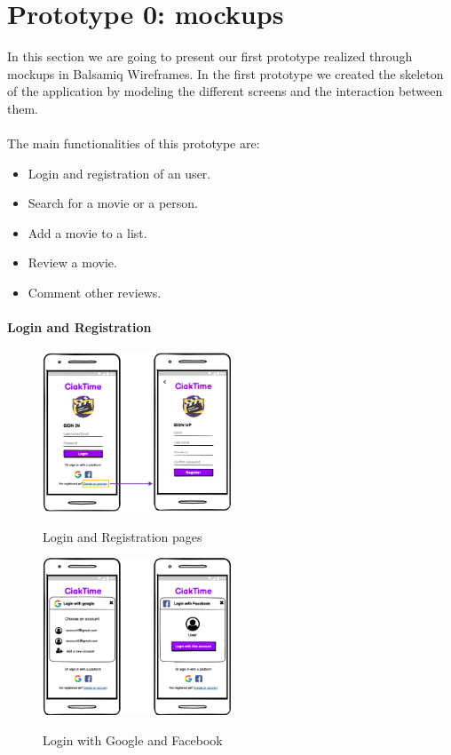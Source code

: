 \documentclass[12pt, a4paper]{article}
\numberwithin{figure}{section}
\begin{document}

\newpage

\section{Prototype 0: mockups}
In this section we are going to present our first prototype realized through mockups
in Balsamiq Wireframes. In the first prototype we created the skeleton of the application
by modeling the different screens and the interaction between them.\\\\ 
The main functionalities of this prototype are:
\begin{itemize}
	\item Login and registration of an user.
	\item Search for a movie or a person.
	\item Add a movie to a list.
	\item Review a movie.
	\item Comment other reviews.
\end{itemize}

\paragraph{Login and Registration}
\mbox{}
\begin{figure}[H]
	\centering
	\includegraphics[width=0.5\textwidth]{images/mockups/signInSignUp.png}\\
	\caption{Login and Registration pages}
\end{figure}
\begin{figure}[H]
	\centering
	\includegraphics[width=0.5\textwidth]{images/mockups/loginSocial.png}\\
	\caption{Login with Google and Facebook}
\end{figure}
\end{document}
